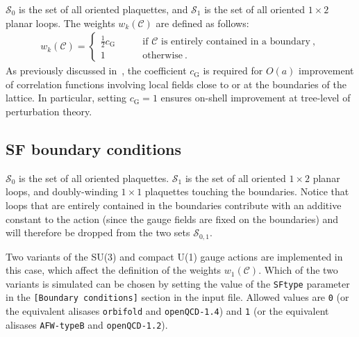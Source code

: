 \documentclass[11pt,fleqn]{article}
\begin{document}
$\mathcal{S}_0$ is the set of all oriented plaquettes, and $\mathcal{S}_1$ is the set of all oriented $1 \times 2$ planar loops. The weights $w_k(\mathcal{C})$ are defined as follows:
\begin{gather}
   w_k(\mathcal{C}) =
   \begin{cases}
      \frac{1}{2} c_\text{G} \qquad & \text{if $\mathcal{C}$ is entirely contained in a boundary} \ , \\
      1 & \text{otherwise} \ .
   \end{cases}
\end{gather}
As previously discussed in~\cite{Luscher:2011kk}, the coefficient $c_\text{G}$ is required for $O(a)$ improvement of correlation functions involving local fields close to or at the boundaries of the lattice. In particular, setting $c_\text{G} = 1$ ensures on-shell improvement at tree-level of perturbation theory.

\subsection{SF boundary conditions}

$\mathcal{S}_0$ is the set of all oriented plaquettes. $\mathcal{S}_1$ is the set of all oriented $1 \times 2$ planar loops, and doubly-winding $1 \times 1$ plaquettes touching the boundaries. Notice that loops that are entirely contained in the boundaries contribute with an additive constant to the action (since the gauge fields are fixed on the boundaries) and will therefore be dropped from the two sets $\mathcal{S}_{0,1}$.

Two variants of the SU(3) and compact U(1) gauge actions are implemented in this case, which affect the definition of the weights $w_1(\mathcal{C})$. Which of the two variants is simulated can be chosen by setting the value of the \texttt{SFtype} parameter in the \texttt{[Boundary conditions]} section in the input file. Allowed values are \texttt{0} (or the equivalent alisases \texttt{orbifold} and \texttt{openQCD-1.4}) and \texttt{1} (or the equivalent alisases \texttt{AFW-typeB} and \texttt{openQCD-1.2}).
\end{document}

